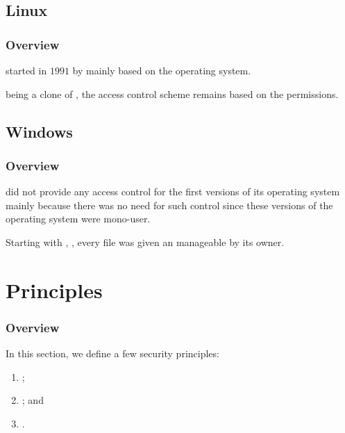 
\subsection{Linux}


\begin{frame}
  \frametitle{Overview}

   started in $1991$ by  mainly based on
  the  operating system.

  \-

   being a clone of , the access control scheme
  remains based on the  permissions.
\end{frame}


\subsection{Windows}


\begin{frame}
  \frametitle{Overview}

   did not provide any access control for the first versions
  of its operating system mainly because there was no need for such control
  since these versions of the operating system were mono-user.

  \-

  Starting with  \ie{} , 
  \etc{}, every file was given an  manageable by
  its owner.
\end{frame}

%
%

\section{Principles}


\begin{frame}
  \frametitle{Overview}

  In this section, we define a few security principles:

  \begin{enumerate}
    \item
      ;
    \item
      ; and
    \item
      .
  \end{enumerate}
\end{frame}

